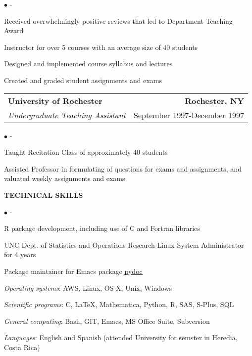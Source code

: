 \documentclass[letterpaper,10pt]{article}
\newcommand{\BJLhref}[2]{\href{#1}{\color{blue}\setulcolor{blue}\ul{#2}}}
\newcommand{\secspace}{7pt}
\begin{document}
\begin{list}{$\bullet$}{\itemsep -5pt \topsep -\parskip}
\item Received overwhelmingly positive reviews that led to
  Department Teaching Award
\item Instructor for over 5 courses with an average size of 40
  students
\item Designed and implemented course syllabus and lectures
\item Created and graded student assignments and exams
\end{list}
	
\begin{tabular*}{7.5in}{l@{\extracolsep{\fill}}r}
\textbf{University of Rochester} & \textbf{Rochester, NY} \\
\emph{Undergraduate Teaching Assistant} & September 1997-December
1997
\end{tabular*}

\begin{list}{$\bullet$}{\itemsep -5pt \topsep -\parskip}
\item Taught Recitation Class of approximately 40 students
\item Assisted Professor in formulating of questions for exams and
  assignments, and valuated weekly assignments and exams
\end{list}

\vspace{\secspace}

\begin{center} {\large \textbf{TECHNICAL SKILLS}}\\
\vspace{-10pt}{\centering \rule{1\columnwidth}{0.2pt}\par}
\end{center}
\vspace{-2pt}

\begin{list}{$\bullet$}{\leftmargin 19pt \itemsep -5pt \topsep
    -\parskip}
\item R package development, including use of C and Fortran libraries
\item UNC Dept. of Statistics and Operations Research Linux System
  Administrator for 4 years
\item Package maintainer for Emacs package \BJLhref{https://github.com/statmobile/pydoc}{pydoc}
\item \emph{Operating systems}: AWS, Linux, OS X, Unix, Windows
\item \emph{Scientific programs}: C, \LaTeX, Mathematica, Python, R,
  SAS, S-Plus, SQL
\item \emph{General computing}: Bash, GIT, Emacs, MS Office Suite,
  Subversion
\item \emph{Languages}: English and Spanish (attended University for
  semster in Heredia, Costa Rica)
\end{list}
	
\end{document}
